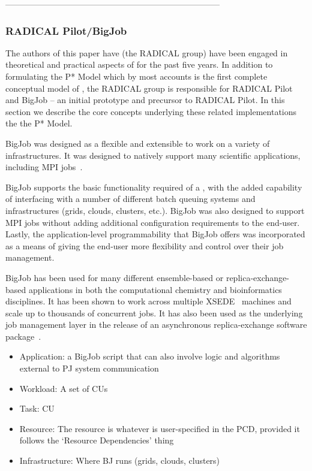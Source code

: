 \documentclass{sig-alternate}
\begin{document}
 -----------------------------------------------------------------------------

\subsubsection{RADICAL Pilot/BigJob}

The authors of this paper have (the RADICAL group) have been engaged
in theoretical and practical aspects of \pilotjobs for the past five
years. In addition to formulating the P* Model which by most accounts
is the first complete conceptual model of \pilotjobs, the RADICAL
group is responsible for RADICAL Pilot and BigJob -- an initial
prototype and precursor to RADICAL Pilot. In this section we describe
the core concepts underlying these related implementations the the P*
Model.


BigJob was designed as a flexible and extensible \pilotjob to work on
a variety of infrastructures.  It was designed to natively support
many scientific applications, including MPI
jobs~\cite{saga_bigjob_condor_cloud}.

BigJob supports the basic functionality required of a \pilotjob, with
the added capability of interfacing with a number of different batch
queuing systems and infrastructures (grids, clouds, clusters, etc.).
BigJob was also designed to support MPI jobs without adding additional
configuration requirements to the end-user.  Lastly, the
application-level programmability that BigJob offers was incorporated
as a means of giving the end-user more flexibility and control over
their job management.

BigJob has been used for many different ensemble-based or
replica-exchange-based applications in both the computational
chemistry and bioinformatics disciplines. It has been shown to work
across multiple XSEDE~\cite{xsede_url} machines and scale up to
thousands of concurrent jobs. It has also been used as the underlying
job management layer in the release of an asynchronous
replica-exchange software package~\cite{2013-xsede-cdi}.

\begin{itemize}
\item Application: a BigJob script that can also involve logic and algorithms
external to PJ system communication
\item Workload: A set of CUs
\item Task: CU
\item Resource: The resource is whatever is user-specified in the PCD, provided it
follows the `Resource Dependencies' thing
\item Infrastructure: Where BJ runs (grids, clouds, clusters)
\end{itemize}
\end{document}
